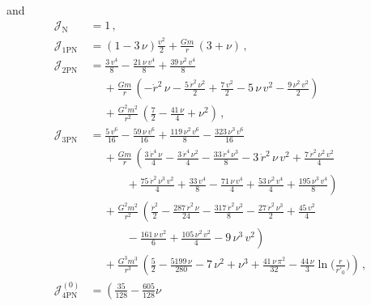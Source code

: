 \documentclass[prd,preprint,superscriptaddress,tightenlines,nofootinbib,
  eqsecnum,showpacs]{revtex4}
\begin{document}
%
and
%
\begin{subequations}\label{J}\begin{align}
\mathcal{J}_\text{N} &= 1\,,\\
\mathcal{J}_\text{1PN} &= \left(1 - 3\, \nu \right)\frac{v^2}{2} +
\frac{G m}{r}\,\left( 3 + \nu \right)\,,\\ 
\mathcal{J}_\text{2PN} &= \frac{3\,v^4}{8} - \frac{21\,\nu\,v^4}{8} +
\frac{39\,\nu^2\,v^4}{8} \nonumber\\ &\quad~ + \frac{G m}{r}\,\left(
-\dot{r}^2\,\nu - \frac{5\,\dot{r}^2\,\nu^2}{2} + \frac{7\,v^2}{2} -
5\,\nu\,v^2 - \frac{9\,\nu^2\,v^2}{2} \right)\nonumber\\ &\quad~
+\frac{G^2m^2}{r^2}\,\left( \frac{7}{2} - \frac{41\,\nu}{4} + \nu^2
\right)\,,\\ 
\mathcal{J}_\text{3PN} &= \frac{5\,v^6}{16} -
\frac{59\,\nu\,v^6}{16} + \frac{119\,\nu^2\,v^6}{8} -
\frac{323\,\nu^3\,v^6}{16} \nonumber\\ &\quad~ + \frac{G m}{r}\,\left(
\frac{3\,\dot{r}^4\,\nu}{4} - \frac{3\,\dot{r}^4\,\nu^2}{4}
-\frac{33\,\dot{r}^4\,\nu^3}{8} - 3\,\dot{r}^2\,\nu\,v^2 +
\frac{7\,\dot{r}^2\,\nu^2\,v^2}{4} \right.\nonumber\\
&\quad\quad\quad~ +\left.  \frac{75\,\dot{r}^2\,\nu^3\,v^2}{4} +
\frac{33\,v^4}{8} - \frac{71\,\nu\,v^4}{4} + \frac{53\,\nu^2\,v^4}{4}
+ \frac{195\,\nu^3\,v^4}{8} \right) \nonumber\\ &\quad~ +
\frac{G^2m^2}{r^2}\,\left( \frac{\dot{r}^2}{2} -
\frac{287\,\dot{r}^2\,\nu}{24} - \frac{317\,\dot{r}^2\,\nu^2}{8} -
\frac{27\,\dot{r}^2\,\nu^3}{2} + \frac{45\,v^2}{4} \right.\nonumber\\
&\quad\quad\quad~ -\left.  \frac{161\,\nu\,v^2}{6} +
\frac{105\,\nu^2\,v^2}{4} - 9\,\nu^3\,v^2 \right) \nonumber\\
&\quad~ + \frac{G^3m^3}{r^3}\,\left( \frac{5}{2} -
\frac{5199\,\nu}{280} - 7\,\nu^2 + \nu^3 + \frac{41\,\nu\,{\pi
}^2}{32} - \frac{44\,\nu}{3}\ln \Big(\frac{r}{r'_0}\Big)
\right)\,,\\ 
\mathcal{J}^{(0)}_\text{4PN} &= \left(\frac{35}{128}
 -  \frac{605}{128} \nu

\end{align}
\end{subequations}
\end{document}
